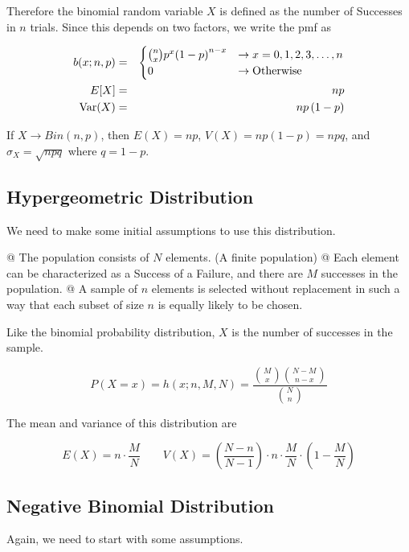     Therefore the binomial random variable $X$ is defined as the number of Successes in $n$ trials. Since this depends
    on two factors, we write the pmf as

        \[
            \begin{aligned}
                b(x;n, p) &=& \begin{cases}
                                \binom{n}{x} p^x {(1 - p)}^{n - x} &\to x = 0, 1, 2, 3, \ldots, n\\
                                0 &\to \text{Otherwise}
                            \end{cases}\\
                E[X] &=& np\\
                \text{Var}(X) &=& np\left( 1 - p \right)
            \end{aligned}
        \]

    If $X \to Bin(n, p)$, then $E(X) = np$, $V(X) = np(1 - p) = npq$, and $\sigma_X = \sqrt{npq}$ where $q = 1 - p$.

    \subsection{Hypergeometric Distribution}
    We need to make some initial assumptions to use this distribution.

        \NewList
        \begin{easylist}
            @ The population consists of $N$ elements. (A finite population)
            @ Each element can be characterized as a Success of a Failure, and there are $M$ successes in the
            population.
            @ A sample of $n$ elements is selected without replacement in such a way that each subset of size $n$ is
            equally likely to be chosen.
        \end{easylist}

    Like the binomial probability distribution, $X$ is the number of successes in the sample.

        \[ P(X=x) = h(x;n, M, N) = \frac{\binom{M}{x} \binom{N-M}{n-x}}{\binom{N}{n}} \]

    The mean and variance of this distribution are

        \[
            E(X) = n \cdot \frac{M}{N}\qquad
            V(X) = \left( \frac{N-n}{N-1} \right) \cdot n \cdot \frac{M}{N} \cdot \left( 1 - \frac{M}{N} \right)
        \]

    \subsection{Negative Binomial Distribution}
    Again, we need to start with some assumptions.

